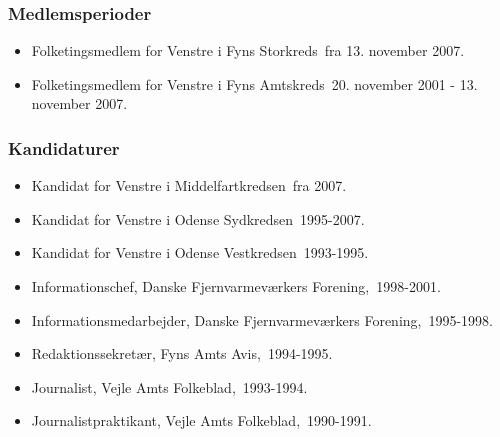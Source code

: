 \documentclass[11pt, a4paper]{awesome-cv}
\begin{document}
\begin{cvletter}
\subsubsection*{Medlemsperioder}
\begin{itemize}
\item Folketingsmedlem for Venstre i Fyns Storkreds fra 13. november 2007.
\item Folketingsmedlem for Venstre i Fyns Amtskreds 20. november 2001 - 13. november 2007.
\end{itemize}
\subsubsection*{Kandidaturer}
\begin{itemize}
\item Kandidat for Venstre i Middelfartkredsen fra 2007.
\item Kandidat for Venstre i Odense Sydkredsen 1995-2007.
\item Kandidat for Venstre i Odense Vestkredsen 1993-1995.
\end{itemize}
\begin{itemize}
\item Informationschef, Danske Fjernvarmeværkers Forening, 1998-2001.
\item Informationsmedarbejder, Danske Fjernvarmeværkers Forening, 1995-1998.
\item Redaktionssekretær, Fyns Amts Avis, 1994-1995.
\item Journalist, Vejle Amts Folkeblad, 1993-1994.
\item Journalistpraktikant, Vejle Amts Folkeblad, 1990-1991.
\end{itemize}
\end{cvletter}
\end{document}
